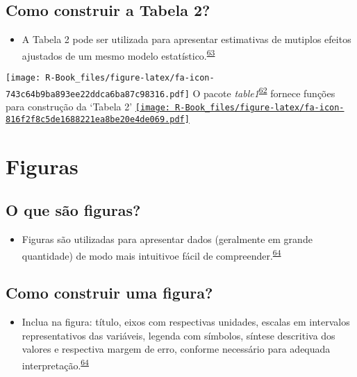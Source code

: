 \documentclass[
]{book}
\providecommand{\tightlist}{%
  \setlength{\itemsep}{0pt}\setlength{\parskip}{0pt}}
\begin{document}
\hypertarget{como-construir-a-tabela-2}{%
\subsection{Como construir a Tabela 2?}\label{como-construir-a-tabela-2}}

\begin{itemize}
\tightlist
\item
  A Tabela 2 pode ser utilizada para apresentar estimativas de mutiplos efeitos ajustados de um mesmo modelo estatístico.\textsuperscript{\protect\hyperlink{ref-Westreich2013}{63}}
\end{itemize}

\texttt{[image: R-Book\_files/figure-latex/fa-icon-743c64b9ba893ee22ddca6ba87c98316.pdf]} O pacote \emph{table1}\textsuperscript{\protect\hyperlink{ref-table1}{62}} fornece funções para construção da `Tabela 2' \href{https://cran.r-project.org/web/packages/table1/index.html}{\texttt{[image: R-Book\_files/figure-latex/fa-icon-816f2f8c5de1688221ea8be20e4de069.pdf]}}

\hypertarget{figuras}{%
\section{Figuras}\label{figuras}}

\hypertarget{o-que-suxe3o-figuras}{%
\subsection{O que são figuras?}\label{o-que-suxe3o-figuras}}

\begin{itemize}
\tightlist
\item
  Figuras são utilizadas para apresentar dados (geralmente em grande quantidade) de modo mais intuitivoe fácil de compreender.\textsuperscript{\protect\hyperlink{ref-Park2022}{64}}
\end{itemize}

\hypertarget{como-construir-uma-figura}{%
\subsection{Como construir uma figura?}\label{como-construir-uma-figura}}

\begin{itemize}
\tightlist
\item
  Inclua na figura: título, eixos com respectivas unidades, escalas em intervalos representativos das variáveis, legenda com símbolos, síntese descritiva dos valores e respectiva margem de erro, conforme necessário para adequada interpretação.\textsuperscript{\protect\hyperlink{ref-Park2022}{64}}
\end{itemize}
\end{document}
